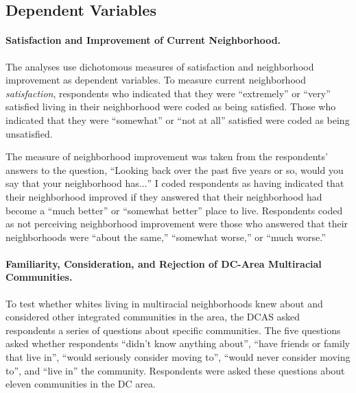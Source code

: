 \documentclass{baderart}
\begin{document}

\subsection{Dependent Variables}\label{dependent-variables}

\paragraph{Satisfaction and Improvement of Current Neighborhood.}
The analyses use dichotomous measures of satisfaction and neighborhood improvement as dependent variables. To measure current neighborhood \emph{satisfaction}, respondents who indicated that they were ``extremely'' or ``very'' satisfied living in their neighborhood were coded as being satisfied. Those who indicated that they were ``somewhat'' or ``not at all'' satisfied were coded as being unsatisfied.

The measure of neighborhood improvement was taken from the respondents' answers to the question, ``Looking back over the past five years or so, would you say that your neighborhood has\(\ldots\)'' I coded respondents as having indicated that their neighborhood improved if they answered that their neighborhood had become a ``much better'' or ``somewhat better'' place to live. Respondents coded as not perceiving neighborhood improvement were those who answered that their neighborhoods were ``about the same,'' ``somewhat worse,'' or ``much worse.''

\paragraph{Familiarity, Consideration, and Rejection of DC-Area Multiracial Communities.}

To test whether whites living in multiracial neighborhoods knew about and considered other integrated communities in the area, the DCAS asked respondents a series of questions about specific communities. The five questions asked whether respondents ``didn't know anything about'', ``have friends or family that live in'', ``would seriously consider moving to'', ``would never consider moving to'', and ``live in'' the community. Respondents were asked these questions about eleven communities in the DC area.
\end{document}
